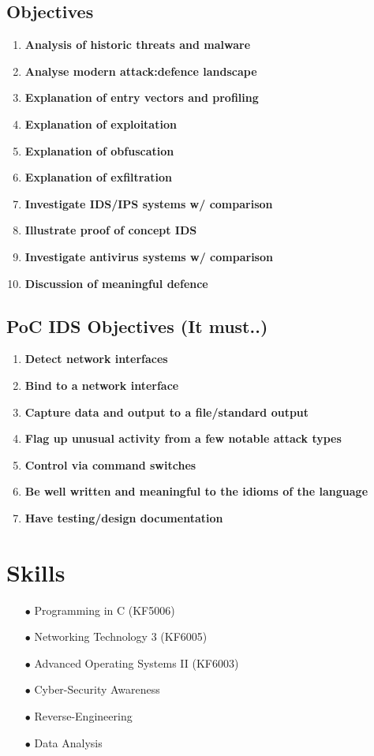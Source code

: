 \subsection{Objectives}
\begin{enumerate}
	\item \textbf{Analysis of historic threats and malware}
	\item \textbf{Analyse modern attack:defence landscape}
	\item \textbf{Explanation of entry vectors and profiling}
	\item \textbf{Explanation of exploitation}
	\item \textbf{Explanation of obfuscation}
	\item \textbf{Explanation of exfiltration}
	\item \textbf{Investigate IDS/IPS systems w/ comparison}
	\item \textbf{Illustrate proof of concept IDS}
	\item \textbf{Investigate antivirus systems w/ comparison}
	\item \textbf{Discussion of meaningful defence}
\end{enumerate}

\subsection{PoC IDS Objectives (It must..)}
\begin{enumerate}
	\item \textbf{Detect network interfaces}
	\item \textbf{Bind to a network interface}
	\item \textbf{Capture data and output to a file/standard output}
	\item \textbf{Flag up unusual activity from a few notable attack types}
	\item \textbf{Control via command switches}
	\item \textbf{Be well written and meaningful to the idioms of the language}
	\item \textbf{Have testing/design documentation}
	
\end{enumerate}

\section{Skills}
\begin{enumerate}
	\item [$\bullet$] Programming in C (KF5006)
	\item [$\bullet$] Networking Technology 3 (KF6005)
	\item [$\bullet$] Advanced Operating Systems II (KF6003)
	\item [$\bullet$] Cyber-Security Awareness
	\item [$\bullet$] Reverse-Engineering
	\item [$\bullet$] Data Analysis
\end{enumerate}

